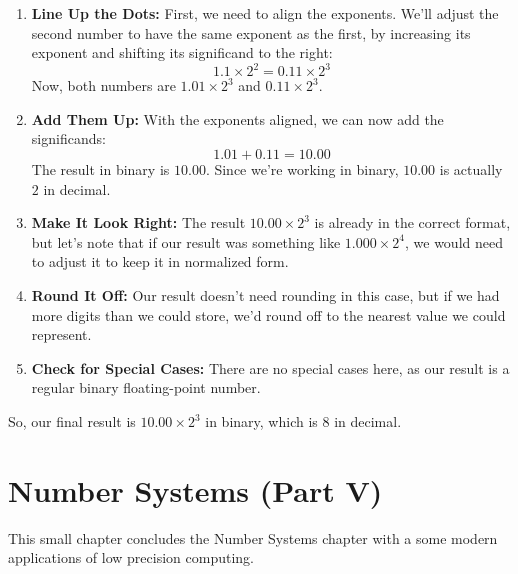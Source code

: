 \documentclass[12pt,openany, tikz,border=10pt]{book}
\begin{document}
			      	\begin{enumerate}
			      		\item \textbf{Line Up the Dots:} First, we need to align the exponents. We'll adjust the second number to have the same exponent as the first, by increasing its exponent and shifting its significand to the right: 
			      		      \[
			      		      	1.1 \times 2^2 = 0.11 \times 2^3
			      		      \]
			      		      Now, both numbers are $1.01 \times 2^3$ and $0.11 \times 2^3$.
			      		      
			      		\item \textbf{Add Them Up:} With the exponents aligned, we can now add the significands:
			      		      \[
			      		      	1.01 + 0.11 = 10.00
			      		      \]
			      		      The result in binary is $10.00$. Since we're working in binary, $10.00$ is actually $2$ in decimal. 
			      		      
			      		\item \textbf{Make It Look Right:} The result $10.00 \times 2^3$ is already in the correct format, but let's note that if our result was something like $1.000 \times 2^4$, we would need to adjust it to keep it in normalized form.
			      		      
			      		\item \textbf{Round It Off:} Our result doesn't need rounding in this case, but if we had more digits than we could store, we'd round off to the nearest value we could represent.
			      		      
			      		\item \textbf{Check for Special Cases:} There are no special cases here, as our result is a regular binary floating-point number.
			      	\end{enumerate}
			      	
			      	So, our final result is $10.00 \times 2^3$ in binary, which is $8$ in decimal.
			      	
			      	
			      	\chapter{Number Systems (Part V)}
			      	
			      	
			      	
			      	
			      	\begin{text}
			      		This small chapter concludes the Number Systems chapter with a some modern applications of low precision computing.
			      	\end{text}
\end{document}
